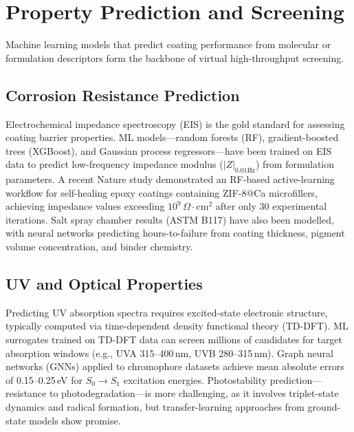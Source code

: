 \documentclass[11pt,a4paper]{article}
\begin{document}
\section{Property Prediction and Screening}
\label{sec:property}

Machine learning models that predict coating performance from molecular or formulation descriptors form the backbone of virtual high-throughput screening.

\subsection{Corrosion Resistance Prediction}

Electrochemical impedance spectroscopy (EIS) is the gold standard for assessing coating barrier properties.
ML models---random forests (RF), gradient-boosted trees (XGBoost), and Gaussian process regressors---have been trained on EIS data to predict low-frequency impedance modulus ($|Z|_{0.01\text{Hz}}$) from formulation parameters.
A recent Nature study demonstrated an RF-based active-learning workflow for self-healing epoxy coatings containing ZIF-8@Ca microfillers, achieving impedance values exceeding $10^9\,\Omega\cdot\text{cm}^2$ after only 30 experimental iterations.
Salt spray chamber results (ASTM B117) have also been modelled, with neural networks predicting hours-to-failure from coating thickness, pigment volume concentration, and binder chemistry.

\subsection{UV and Optical Properties}

Predicting UV absorption spectra requires excited-state electronic structure, typically computed via time-dependent density functional theory (TD-DFT).
ML surrogates trained on TD-DFT data can screen millions of candidates for target absorption windows (e.g., UVA 315--400\,nm, UVB 280--315\,nm).
Graph neural networks (GNNs) applied to chromophore datasets achieve mean absolute errors of 0.15--0.25\,eV for $S_0 \to S_1$ excitation energies.
Photostability prediction---resistance to photodegradation---is more challenging, as it involves triplet-state dynamics and radical formation, but transfer-learning approaches from ground-state models show promise.
\end{document}

